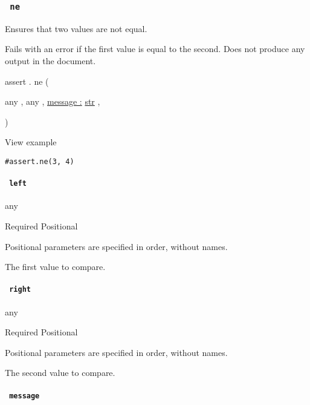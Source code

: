 \subsubsection{\texorpdfstring{\texttt{\ ne\ }}{ ne }}\label{definitions-ne}

Ensures that two values are not equal.

Fails with an error if the first value is equal to the second. Does not
produce any output in the document.

assert { . } { ne } (

{ { any } , } { { any } , } {
\hyperref[definitions-ne-parameters-message]{message :}
\href{/docs/reference/foundations/str/}{str} , }

)


View example

\begin{verbatim}
#assert.ne(3, 4)
\end{verbatim}

\paragraph{\texorpdfstring{\texttt{\ left\ }}{ left }}\label{definitions-ne-left}

{ any }

{Required} {{ Positional }}

\label{definitions-ne-left-positional-tooltip}
Positional parameters are specified in order, without names.

The first value to compare.

\paragraph{\texorpdfstring{\texttt{\ right\ }}{ right }}\label{definitions-ne-right}

{ any }

{Required} {{ Positional }}

\label{definitions-ne-right-positional-tooltip}
Positional parameters are specified in order, without names.

The second value to compare.

\paragraph{\texorpdfstring{\texttt{\ message\ }}{ message }}\label{definitions-ne-message}


